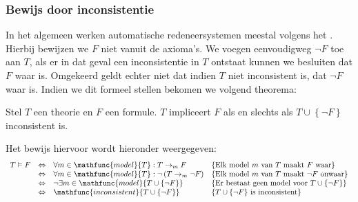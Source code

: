 \subsubsection{Bewijs door inconsistentie}
\label{sss:inconsistenceProof}
In het algemeen werken automatische redeneersystemen meestal volgens het . Hierbij bewijzen we $F$ niet vanuit de axioma's. We voegen eenvoudigweg $\neg F$ toe aan $T$, als er in dat geval een inconsistentie in $T$ ontstaat kunnen we besluiten dat $F$ waar is. Omgekeerd geldt echter niet dat indien $T$ niet inconsistent is, dat $\neg F$ waar is. Indien we dit formeel stellen bekomen we volgend theorema:
\begin{theorem}
Stel $T$ een theorie en $F$ een formule. $T$ impliceert $F$ als en slechts als $T\cup\left\{\neg F\right\}$ inconsistent is.
\end{theorem}
Het bewijs hiervoor wordt hieronder weergegeven:
\begin{equation}
\begin{array}{rcll}
T\vDash F&\Leftrightarrow&\forall m\in\mathfunc{model}{T}:T\displaystyle\rightarrow_mF&\mbox{\{Elk model $m$ van $T$ maakt $F$ waar\}}\\
&\Leftrightarrow&\forall m\in\mathfunc{model}{T}:\neg\left(T\displaystyle\rightarrow_m\neg F\right)&\mbox{\{Elk model $m$ van $T$ maakt $\neg F$ onwaar\}}\\
&\Leftrightarrow&\neg\exists m\in\mathfunc{model}{T\cup\left\{\neg F\right\}}&\mbox{\{Er bestaat geen model voor $T\cup\left\{\neg F\right\}$\}}\\
&\Leftrightarrow&\mathfunc{inconsistent}{T\cup\left\{\neg F\right\}}&\mbox{\{$T\cup\left\{\neg F\right\}$ is inconsistent\}}
\end{array}
\end{equation}
